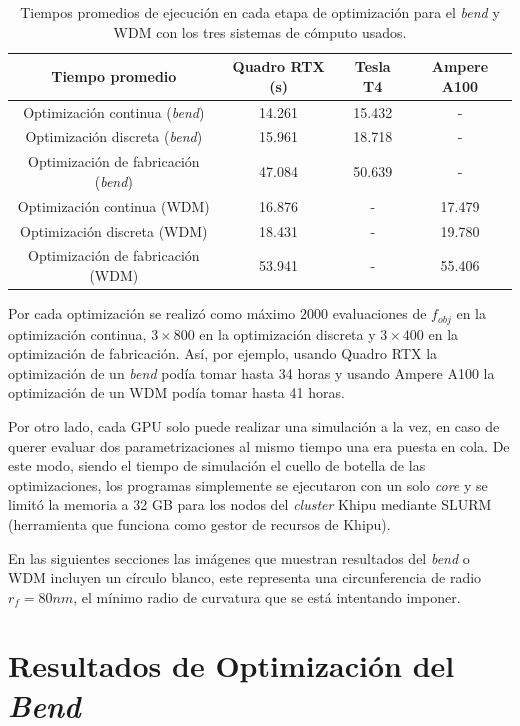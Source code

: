 \begin{table}[ht]
    \centering
    \begin{tabular}{|c|c|c|c|}
    \hline 
      Tiempo promedio &  Quadro RTX (s) & Tesla T4 & Ampere A100 \\
    \hline 
      Optimización continua (\emph{bend})            & 14.261 & 15.432 & - \\
      Optimización discreta (\emph{bend})            & 15.961 & 18.718 & - \\
      Optimización de fabricación (\emph{bend})      & 47.084 & 50.639 & - \\
      Optimización continua (WDM)                    & 16.876 & - & 17.479 \\
      Optimización discreta (WDM)                    & 18.431 & - & 19.780 \\
      Optimización de fabricación (WDM)              & 53.941 & - & 55.406 \\
    \hline 
    \end{tabular}
    \caption{Tiempos promedios de ejecución en cada etapa de optimización para el \emph{bend} y WDM con los
    tres sistemas de cómputo usados.}
    \label{tab:times}
\end{table}

Por cada optimización se realizó como máximo $2000$ evaluaciones de $f_{obj}$ en la optimización continua,
$3 \times 800$ en la optimización discreta y $3 \times 400$ en la optimización de fabricación.
Así, por ejemplo, usando Quadro RTX la optimización de un \emph{bend} podía tomar hasta 34 horas
y usando Ampere A100 la optimización de un WDM podía tomar hasta 41 horas.

Por otro lado, cada GPU solo puede realizar una simulación a la vez, en caso de querer 
evaluar dos parametrizaciones al mismo tiempo una era puesta en cola. De este modo,
siendo el tiempo de simulación el cuello de botella de las optimizaciones, los programas simplemente
se ejecutaron con un solo \emph{core} y se limitó la memoria a 32 GB para los nodos del \emph{cluster}
Khipu mediante SLURM (herramienta que funciona como gestor de recursos de Khipu).


En las siguientes secciones las imágenes que muestran resultados del \emph{bend} o WDM
incluyen un círculo blanco, este representa una circunferencia de radio $r_f = 80 nm$,
el mínimo radio de curvatura que se está intentando imponer.


\section{Resultados de Optimización del \emph{Bend}}\label{sec:results-bend}

